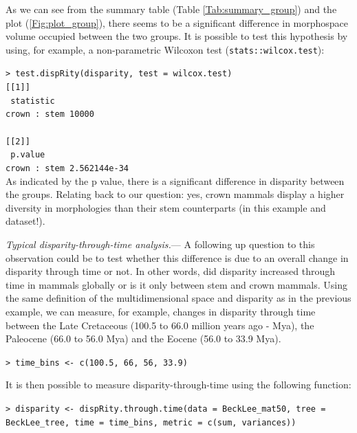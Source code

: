 \documentclass[12pt,letterpaper]{article}
\renewcommand{\subsubsection}[1]{%
\vspace{2ex}
\noindent
\textit{#1.}---}
\begin{document}
As we can see from the summary table (Table \ref{Tab:summary_group}) and the plot (\ref{Fig:plot_group}), there seems to be a significant difference in morphospace volume occupied between the two groups.
It is possible to test this hypothesis by using, for example, a non-parametric Wilcoxon test (\texttt{stats::wilcox.test}):

\noindent \texttt{> test.dispRity(disparity, test = wilcox.test)}\\

\noindent \texttt{[[1]]}\\
\noindent \texttt{             statistic}\\
\noindent \texttt{crown : stem     10000}\\
\noindent \texttt{ }\\
\noindent \texttt{[[2]]}\\
\noindent \texttt{                  p.value}\\
\noindent \texttt{crown : stem 2.562144e-34}\\

\bigskip
As indicated by the p value, there is a significant difference in disparity between the groups.
Relating back to our question: yes, crown mammals display a higher diversity in morphologies than their stem counterparts (in this example and dataset!).

\subsubsection{Typical disparity-through-time analysis}
A following up question to this observation could be to test whether this difference is due to an overall change in disparity through time or not.
In other words, did disparity increased through time in mammals globally or is it only between stem and crown mammals.
Using the same definition of the multidimensional space and disparity as in the previous example, we can measure, for example, changes in disparity through time between the Late Cretaceous (100.5 to 66.0 million years ago - Mya), the Paleocene (66.0 to 56.0 Mya) and the Eocene (56.0 to 33.9 Mya).

\noindent \texttt{> time\_bins <- c(100.5, 66, 56, 33.9)}

It is then possible to measure disparity-through-time using the following function:

\noindent \texttt{> disparity <- dispRity.through.time(data = BeckLee\_mat50, tree = BeckLee\_tree, time = time\_bins, metric = c(sum, variances))}
\end{document}
